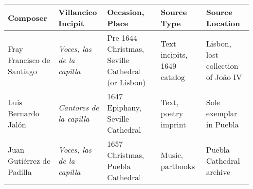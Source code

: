 \documentclass{aac-table}
\begin{document}
\small
\renewcommand{\arraystretch}{1.5}
\begin{tabulary}{\textwidth}{LLLLL}
    \toprule
    Composer & Villancico Incipit & Occasion, Place & Source Type & Source
    Location \\ \midrule
    
    Fray Francisco de Santiago & 
    \emph{Voces, las de la capilla} &
    Pre-1644 Christmas, Seville Cathedral (or Lisbon) &
    Text incipits, 1649 catalog &
    Lisbon, lost collection of João IV \\

    Luis Bernardo Jalón & 
    \emph{Cantores de la capilla} & 
    1647 Epiphany, Seville Cathedral & 
    Text, poetry imprint & 
    Sole exemplar in Puebla \\

    Juan Gutiérrez de Padilla & 
    \emph{Voces, las de la capilla} & 
    1657 Christmas, Puebla Cathedral & 
    Music, partbooks & 
    Puebla Cathedral archive \\
    \bottomrule
\end{tabulary}
\end{document}

